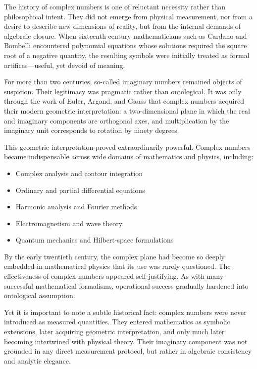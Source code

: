 \documentclass[12pt]{book}  %
\begin{document}
The history of complex numbers is one of reluctant necessity rather than philosophical intent. They did not emerge from physical measurement, nor from a desire to describe new dimensions of reality, but from the internal demands of algebraic closure. When sixteenth-century mathematicians such as Cardano and Bombelli encountered polynomial equations whose solutions required the square root of a negative quantity, the resulting symbols were initially treated as formal artifices—useful, yet devoid of meaning.

For more than two centuries, so-called imaginary numbers remained objects of suspicion. Their legitimacy was pragmatic rather than ontological. It was only through the work of Euler, Argand, and Gauss that complex numbers acquired their modern geometric interpretation: a two-dimensional plane in which the real and imaginary components are orthogonal axes, and multiplication by the imaginary unit corresponds to rotation by ninety degrees.

This geometric interpretation proved extraordinarily powerful. Complex numbers became indispensable across wide domains of mathematics and physics, including:

\begin{itemize}
    \item Complex analysis and contour integration
    \item Ordinary and partial differential equations
    \item Harmonic analysis and Fourier methods
    \item Electromagnetism and wave theory
    \item Quantum mechanics and Hilbert-space formulations
\end{itemize}

By the early twentieth century, the complex plane had become so deeply embedded in mathematical physics that its use was rarely questioned. The effectiveness of complex numbers appeared self-justifying. As with many successful mathematical formalisms, operational success gradually hardened into ontological assumption.

Yet it is important to note a subtle historical fact: complex numbers were never introduced as measured quantities. They entered mathematics as symbolic extensions, later acquiring geometric interpretation, and only much later becoming intertwined with physical theory. Their imaginary component was not grounded in any direct measurement protocol, but rather in algebraic consistency and analytic elegance.
\end{document}
